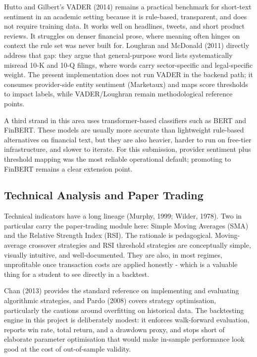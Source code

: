 \documentclass[12pt,a4paper]{report}
\numberwithin{equation}{chapter}
\begin{document}
Hutto and Gilbert's VADER (2014) remains a practical benchmark for short-text sentiment in an academic setting because it is rule-based, transparent, and does not require training data. It works well on headlines, tweets, and short product reviews. It struggles on denser financial prose, where meaning often hinges on context the rule set was never built for. Loughran and McDonald (2011) directly address that gap: they argue that general-purpose word lists systematically misread 10-K and 10-Q filings, where words carry sector-specific and legal-specific weight. The present implementation does not run VADER in the backend path; it consumes provider-side entity sentiment (Marketaux) and maps score thresholds to impact labels, while VADER/Loughran remain methodological reference points.

A third strand in this area uses transformer-based classifiers such as BERT and FinBERT. These models are usually more accurate than lightweight rule-based alternatives on financial text, but they are also heavier, harder to run on free-tier infrastructure, and slower to iterate. For this submission, provider sentiment plus threshold mapping was the most reliable operational default; promoting to FinBERT remains a clear extension point.

\subsection{Technical Analysis and Paper Trading}

Technical indicators have a long lineage (Murphy, 1999; Wilder, 1978). Two in particular carry the paper-trading module here: Simple Moving Averages (SMA) and the Relative Strength Index (RSI). The rationale is pedagogical. Moving-average crossover strategies and RSI threshold strategies are conceptually simple, visually intuitive, and well-documented. They are also, in most regimes, unprofitable once transaction costs are applied honestly - which is a valuable thing for a student to see directly in a backtest.

Chan (2013) provides the standard reference on implementing and evaluating algorithmic strategies, and Pardo (2008) covers strategy optimisation, particularly the cautions around overfitting on historical data. The backtesting engine in this project is deliberately modest: it enforces walk-forward evaluation, reports win rate, total return, and a drawdown proxy, and stops short of elaborate parameter optimisation that would make in-sample performance look good at the cost of out-of-sample validity.
\end{document}
